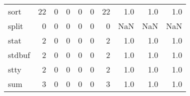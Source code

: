 \begin{tabular}{lrrrrrrrrr}
sort      &                                                 22 &                                                  0 &                                                  0 &                                                  0 &                                                  0 &                                                 22 &                                                1.0 &                                    1.0 &                                  1.0 \\
split     &                                                  0 &                                                  0 &                                                  0 &                                                  0 &                                                  0 &                                                  0 &                                                NaN &                                    NaN &                                  NaN \\
stat      &                                                  2 &                                                  0 &                                                  0 &                                                  0 &                                                  0 &                                                  2 &                                                1.0 &                                    1.0 &                                  1.0 \\
stdbuf    &                                                  2 &                                                  0 &                                                  0 &                                                  0 &                                                  0 &                                                  2 &                                                1.0 &                                    1.0 &                                  1.0 \\
stty      &                                                  2 &                                                  0 &                                                  0 &                                                  0 &                                                  0 &                                                  2 &                                                1.0 &                                    1.0 &                                  1.0 \\
sum       &                                                  3 &                                                  0 &                                                  0 &                                                  0 &                                                  0 &                                                  3 &                                                1.0 &                                    1.0 &                                  1.0 \\

\end{tabular}

